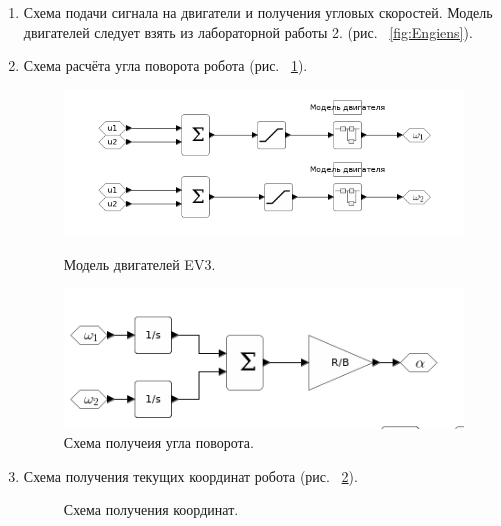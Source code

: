 \documentclass[12pt,a4paper,openany]{extarticle}
\begin{document}
\begin{enumerate}
\item Схема подачи сигнала на двигатели и получения угловых скоростей. Модель двигателей следует взять из лабораторной работы 2. (рис. ~\ref{fig:Engiens}).


\item Схема расчёта угла поворота робота (рис. ~\ref{fig:steering_angle}).

\begin{figure}[h!]
\begin{center}
    \begin{minipage}[h]{0.4\linewidth}
    \includegraphics[width=1\linewidth]{images/Engiens.png}
    \caption{Модель двигателей EV3.}
    \label{fig:Engiens}
    \end{minipage}
    \hfill
    \begin{minipage}[h]{0.4\linewidth}
    \includegraphics[width=1\linewidth]{images/angle.png}
    \caption{Схема получеия угла поворота.}
    \label{fig:steering_angle}
    \end{minipage}
\end{center}
\end{figure}

\item Схема получения текущих координат робота (рис. ~\ref{fig:Coord}).

 \begin{figure}[h!]
    \caption{Схема получения координат.}
	\label{fig:Coord}
\end{figure} 

\end{enumerate}
\end{document}
